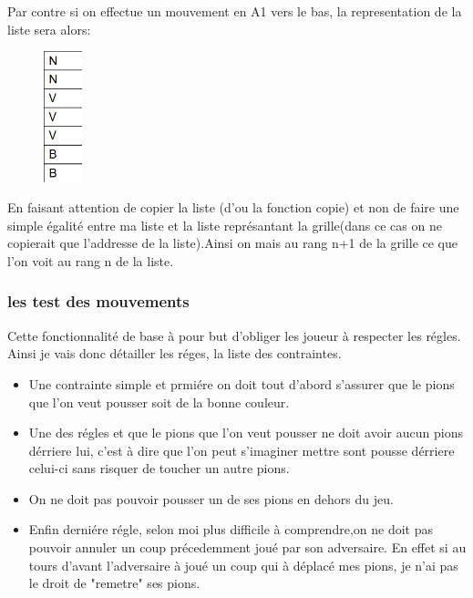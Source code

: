 \documentclass{article}
\begin{document}
Par contre si on effectue un mouvement en A1 vers le bas, la representation de la liste sera alors:
\begin{figure}[!h]
\centerline{\includegraphics[width=0.1\textwidth]{images/colonne.png}}
\vspace{1cm}
\caption{}
\end{figure}

En faisant attention de copier la liste (d'ou la fonction copie) et non de faire une simple égalité entre ma liste et la liste représantant la grille(dans ce cas on ne copierait que l'addresse de la liste).Ainsi on mais au rang n+1 de la grille ce que l'on voit au rang n de la liste.
\newpage
\subsubsection{les test des mouvements}
Cette fonctionnalité de base à pour but d'obliger les joueur à respecter les régles. Ainsi je vais donc détailler les réges, la liste des contraintes.
\vspace{0.5cm}
\begin{itemize}
\item Une contrainte simple et prmiére on doit tout d'abord s'assurer que le pions que l'on veut pousser soit de la bonne couleur.

\item Une des régles et que le pions que l'on veut pousser ne doit avoir aucun pions dérriere lui, c'est à dire que l'on peut s'imaginer mettre sont pousse dérriere celui-ci sans risquer de toucher un autre pions.

\item On ne doit pas pouvoir pousser un de ses pions en dehors du jeu.

\item Enfin derniére régle, selon moi plus difficile à comprendre,on ne doit pas pouvoir annuler un coup précedemment joué par son adversaire. En effet si au tours d'avant l'adversaire à joué un coup qui à déplacé mes pions, je n'ai pas le droit de "remetre" ses pions.

\end{itemize}
\vspace{0.5cm}
\end{document}
